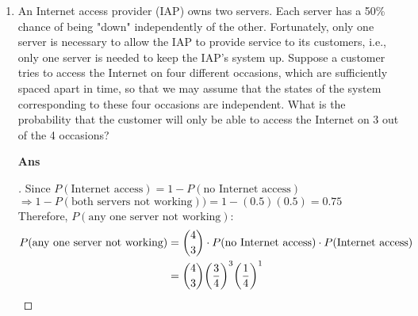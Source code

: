 \documentclass[paper=usletter, fontsize=12pt]{article}
\begin{document}
\begin{enumerate}
        \item An Internet access provider (IAP) owns two servers. Each server
        has a 50\% chance of being "down" independently of the other.
        Fortunately, only one server is necessary to allow the IAP to provide
        service to its customers, i.e., only one server is needed to keep the
        IAP's system up. Suppose a customer tries to access the Internet on
        four different occasions, which are sufficiently spaced apart in time,
        so that we may assume that the states of the system corresponding to
        these four occasions are independent. What is the probability that the
        customer will only be able to access the Internet on 3 out of the 4
        occasions?
        \item[\textbf{Ans}]
        \begin{proof}[\unskip\nopunct]
            Since $P(\text{Internet access}) = 1 - P(\text{no Internet
            access})$ \\
            $\Rightarrow 1 - P(\text{both servers not working})) = 1 -
            (0.5)(0.5) = 0.75$ \\
            Therefore, $P(\text{any one server not working})$:
            \begin{align*}
                P(\text{any one server not working}) & = \binom{4}{3} \cdot P(\text{no Internet access}) \cdot P(\text{Internet access}) \\
                & = \binom{4}{3} \bigg(\frac{3}{4}\bigg)^3
                \bigg(\frac{1}{4}\bigg)^1 \qedhere
            \end{align*}
        \end{proof}
        \vspace{0.2in}


\end{enumerate}
\end{document}
